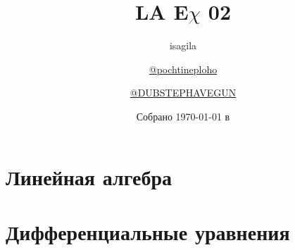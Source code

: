 \documentclass[a4paper]{article}
\title{\huge \textbf{LA E\(\chi\) 02}}
\author{
  isagila
  \and
  \href{https://t.me/pochtineploho}{@pochtineploho}
  \and
  \href{https://t.me/DUBSTEPHAVEGUN}{@DUBSTEPHAVEGUN}
}
\date{Собрано {\ddmmyyyydate\today} в \currenttime}
\begin{document}
\setlength{\abovedisplayskip}{-5pt}
\setlength{\abovedisplayshortskip}{0pt}
\setlength{\belowdisplayskip}{0pt}
\setlength{\belowdisplayshortskip}{0pt}

\clearpage
\maketitle
\thispagestyle{mainpage}
\newpage
\setcounter{page}{2}
\tableofcontents

\newpage
\section{Линейная алгебра}

\begin{questions}
  
  
  
  
  
  
  
  
  
  
  
  
  
  
\end{questions}

\newpage
\section{Дифференциальные уравнения}

\begin{questions}
  
  
  
  
  
  
  
  
  
  
  
  
  
  
  
  
  
  
  
  
\end{questions}
\end{document}
